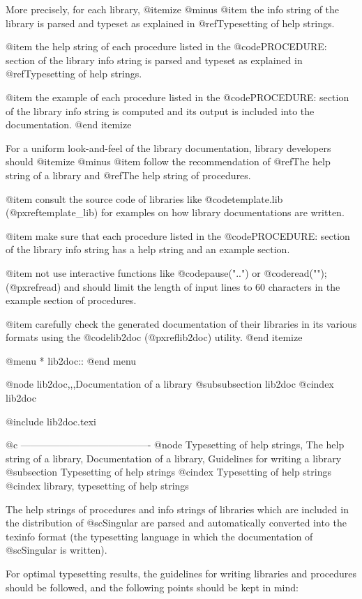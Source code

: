 {{{{More precisely, for each library,
@itemize @minus
@item
the info string of the library is parsed and typeset
as explained in @ref{Typesetting of help strings}.

@item
the help string of each procedure listed in the @code{PROCEDURE:}
section of the library info string is parsed
and typeset as explained in @ref{Typesetting of help strings}.

@item
the example of each procedure listed in the @code{PROCEDURE:} section of
the library info string is computed and its output is
included into the documentation.
@end itemize

For a uniform look-and-feel of the library documentation, library
developers should
@itemize @minus
@item
follow the recommendation of
@ref{The help string of a library} and @ref{The help string of
procedures}.

@item
consult the source code of libraries like
@code{template.lib} (@pxref{template_lib})
for examples on how library documentations are
written.

@item
make sure that each procedure listed in the @code{PROCEDURE:}
section of the library info string has a help string and an example
section.

@item
not use interactive functions like
@code{pause("..")} or @code{read("");} (@pxref{read}) and should limit the
length of input lines to 60 characters in the example section of
procedures.

@item
carefully check the generated
documentation of their libraries in its various formats using the
@code{lib2doc} (@pxref{lib2doc}) utility.
@end itemize

@menu
* lib2doc::
@end menu

@node lib2doc,,,Documentation of a library
@subsubsection lib2doc
@cindex lib2doc

@include lib2doc.texi

@c ----------------------------------------
@node Typesetting of help strings, The help string of a library, Documentation of a library, Guidelines for writing a library
@subsection Typesetting of help strings
@cindex Typesetting of help strings
@cindex library, typesetting of help strings

The help strings of procedures and info strings of libraries which are
included in the
distribution of @sc{Singular} are parsed and automatically converted
into the texinfo format (the typesetting language in which the
documentation  of @sc{Singular} is written).

For optimal typesetting results, the guidelines for writing libraries
and procedures should be followed, and the following points should be
kept in mind:

}}}}
